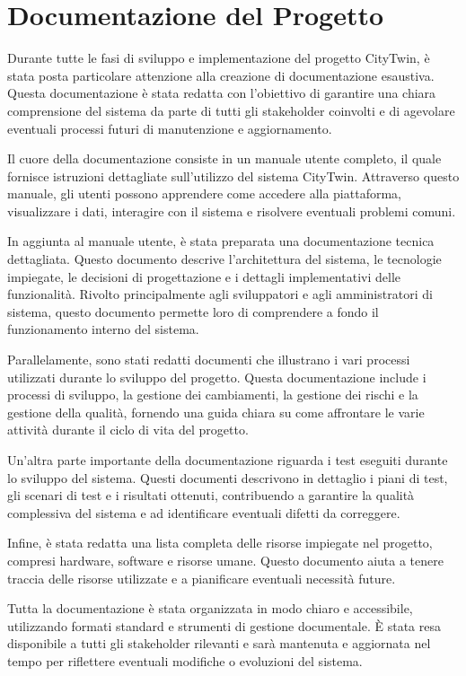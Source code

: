\section{Documentazione del Progetto}
Durante tutte le fasi di sviluppo e implementazione del progetto CityTwin, è stata posta particolare attenzione alla creazione di documentazione esaustiva. Questa documentazione è stata redatta con l'obiettivo di garantire una chiara comprensione del sistema da parte di tutti gli stakeholder coinvolti e di agevolare eventuali processi futuri di manutenzione e aggiornamento.

Il cuore della documentazione consiste in un manuale utente completo, il quale fornisce istruzioni dettagliate sull'utilizzo del sistema CityTwin. Attraverso questo manuale, gli utenti possono apprendere come accedere alla piattaforma, visualizzare i dati, interagire con il sistema e risolvere eventuali problemi comuni.

In aggiunta al manuale utente, è stata preparata una documentazione tecnica dettagliata. Questo documento descrive l'architettura del sistema, le tecnologie impiegate, le decisioni di progettazione e i dettagli implementativi delle funzionalità. Rivolto principalmente agli sviluppatori e agli amministratori di sistema, questo documento permette loro di comprendere a fondo il funzionamento interno del sistema.

Parallelamente, sono stati redatti documenti che illustrano i vari processi utilizzati durante lo sviluppo del progetto. Questa documentazione include i processi di sviluppo, la gestione dei cambiamenti, la gestione dei rischi e la gestione della qualità, fornendo una guida chiara su come affrontare le varie attività durante il ciclo di vita del progetto.

Un'altra parte importante della documentazione riguarda i test eseguiti durante lo sviluppo del sistema. Questi documenti descrivono in dettaglio i piani di test, gli scenari di test e i risultati ottenuti, contribuendo a garantire la qualità complessiva del sistema e ad identificare eventuali difetti da correggere.

Infine, è stata redatta una lista completa delle risorse impiegate nel progetto, compresi hardware, software e risorse umane. Questo documento aiuta a tenere traccia delle risorse utilizzate e a pianificare eventuali necessità future.

Tutta la documentazione è stata organizzata in modo chiaro e accessibile, utilizzando formati standard e strumenti di gestione documentale. È stata resa disponibile a tutti gli stakeholder rilevanti e sarà mantenuta e aggiornata nel tempo per riflettere eventuali modifiche o evoluzioni del sistema.

